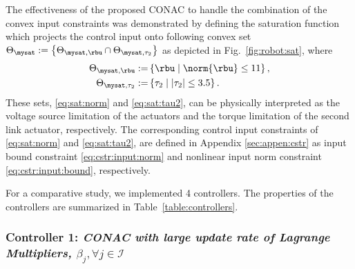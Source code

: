 \documentclass[lettersize,journal]{IEEEtran}
\begin{document}
The effectiveness of the proposed CONAC to handle the combination of the convex input constraints was demonstrated by defining the saturation function which projects the control input onto following convex set $\Theta_{\mysat}:=\left\{\Theta_{\mysat, {\rbu}}\cap\Theta_{\mysat, {\tau_2}}\right\}$ as depicted in Fig.~\ref{fig:robot:sat}, where
\begin{subequations}
    \begin{align}
        \Theta_{\mysat, {\rbu}}
        :=&
        \left\{
            \rbu
            \mid
            \norm{\rbu} \le 
            11
        \right\}
        \label{eq:sat:norm}
        ,
        \\
        \Theta_{\mysat, {\tau_2}}
        :=&
        \left\{
            \tau_2
            \mid
            \vert{\tau_2}\vert \le 
            3.5
        \right\}
        .
        \label{eq:sat:tau2}
    \end{align}
    \label{eq:sat}%
\end{subequations}
These sets, \eqref{eq:sat:norm} and \eqref{eq:sat:tau2}, can be physically interpreted as the voltage source limitation of the actuators and the torque limitation of the second link actuator, respectively.
The corresponding control input constraints of \eqref{eq:sat:norm} and \eqref{eq:sat:tau2}, are defined in Appendix \ref{sec:appen:cstr} as input bound constraint \eqref{eq:cstr:input:norm} and nonlinear input norm constraint \eqref{eq:cstr:input:bound}, respectively.

\hfill
For a comparative study, we implemented 4 controllers.
The properties of the controllers are summarized in Table~\ref{table:controllers}.

\subsubsection*{Controller 1:  \textit{CONAC with large update rate of Lagrange Multipliers, $\beta_j,\forall j\in\mathcal{I}$}}
\end{document}
